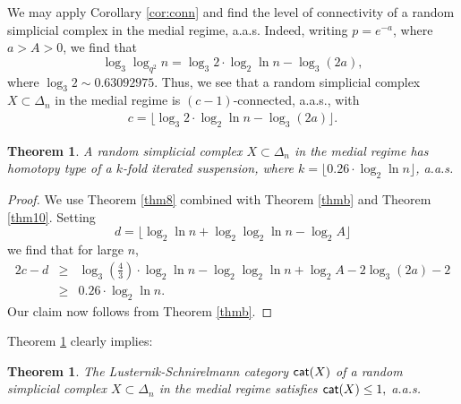 \documentclass[10pt,a4paper]{amsart}
\newtheorem{teo}[lema]{Theorem}
\newcommand{\cat}{{\sf{cat}}}
\begin{document}
We may apply Corollary \ref{cor:conn} 
and find the level of connectivity of a random simplicial complex in the medial regime, a.a.s. 
Indeed, writing $p=e^{-a}$, where $a>A>0$, we find that 
$$
\log_3\log_{q^2}n= \log_3 2\cdot \log_2\ln n - \log_3(2a), 
$$
where $\log_3 2\sim 0.63092975$. Thus, we see that a random simplicial complex $X\subset \Delta_n$ in the medial regime is $(c-1)$-connected, a.a.s.,
with 
\begin{eqnarray*}\label{c}
c=\lfloor  
  \log_3 2\cdot \log_2\ln n - \log_3(2a)  
\rfloor.
\end{eqnarray*}
\begin{teo}\label{thm14}
A random simplicial complex $X\subset \Delta_n$ in the medial regime has homotopy type of a $k$-fold iterated suspension, where $k=\lfloor 0.26 \cdot \log_2\ln n\rfloor$, a.a.s.
\end{teo}
\begin{proof} We use Theorem \ref{thm8} combined with Theorem \ref{thmb} and Theorem \ref{thm10}. 
Setting $$d=\lfloor \log_2\ln n +\log_2\log_2\ln n- \log_2 A\rfloor$$
we find that for large $n$, 
\begin{eqnarray*}
2c-d &\ge & \log_3\left(\frac{4}{3}\right) \cdot \log_2\ln n -\log_2\log_2\ln n +\log_2 A -2\log_3(2a)-2\\
&\ge& 0.26 \cdot \log_2\ln n.
\end{eqnarray*}
Our claim now follows from Theorem \ref{thmb}. 
\end{proof}
Theorem \ref{thm14} clearly implies:

\begin{teo}\label{thm:thm1}
The Lusternik-Schnirelmann category $\cat(X)$ of a random simplicial complex $X\subset \Delta_n$ in the medial regime satisfies
$
\cat(X)\le 1,
$
a.a.s. %
\end{teo}

%
%
%
%
%
%
\end{document}

